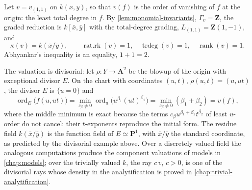 \begin{example}[A divisorial valuation: $\alpha=(1,1)$]
\label{ex:gallery-divisorial}
Let $v=v_{(1,1)}$ on $k(x,y)$, so that $v(f)$ is the order of vanishing
of $f$ at the origin: the least total degree in $f$. By
\cref{lem:monomial-invariants}, $\Gamma_v=\mathbf Z$, the graded
reduction is $k[\bar x,\bar y]$ with the total-degree grading,
$L_{(1,1)}=\mathbf Z(1,-1)$, and
\[
 \kappa(v)=k(\bar x/\bar y),
 \qquad
 \operatorname{rat.rk}(v)=1,\quad
 \operatorname{trdeg}(v)=1,\quad
 \operatorname{rank}(v)=1 .
\]
Abhyankar's inequality is an equality, $1+1=2$.

The valuation is divisorial: let $\rho:Y\to\mathbf A^2$ be the blowup of
the origin with exceptional divisor $E$. On the chart with coordinates
$(u,t)$, $\rho(u,t)=(u,ut)$, the divisor $E$ is $\{u=0\}$ and
\[
 \operatorname{ord}_E\bigl(f(u,ut)\bigr)
 =\min_{c_\beta\neq0}\operatorname{ord}_u
 \bigl(u^{\beta_1}(ut)^{\beta_2}\bigr)
 =\min_{c_\beta\neq0}(\beta_1+\beta_2)=v(f),
\]
where the middle minimum is exact because the terms
$c_\beta u^{\beta_1+\beta_2}t^{\beta_2}$ of least $u$-order do not cancel:
their $t$-exponents reproduce the initial form. The residue field
$k(\bar x/\bar y)$ is the function field of
$E\simeq\mathbf P^1$, with $\bar x/\bar y$ the standard coordinate, as
predicted by the divisorial example above. Over a discretely valued
field the analogous computations produce the component valuations of
models in \cref{chap:models}; over the trivially valued $k$, the ray
$c\,v$, $c>0$, is one of the divisorial rays whose density in the
analytification is proved in \cref{chap:trivial-analytification}.
\end{example}

